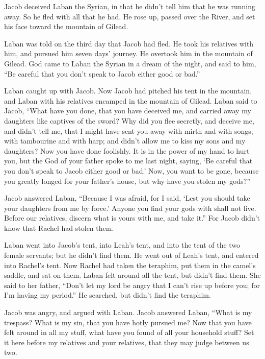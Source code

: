\myverse{}Jacob deceived Laban the Syrian, in that he didn’t tell him that he was running away.   \myverse{}So he fled with all that he had. He rose up, passed over the River, and set his face toward the mountain of Gilead.

\myverse{}Laban was told on the third day that Jacob had fled.  \myverse{}He took his relatives with him, and pursued him seven days’ journey. He overtook him in the mountain of Gilead.  \myverse{}God came to Laban the Syrian in a dream of the night, and said to him, “Be careful that you don’t speak to Jacob either good or bad.”

\myverse{}Laban caught up with Jacob. Now Jacob had pitched his tent in the mountain, and Laban with his relatives encamped in the mountain of Gilead.  \myverse{}Laban said to Jacob, “What have you done, that you have deceived me, and carried away my daughters like captives of the sword?  \myverse{}Why did you flee secretly, and deceive me, and didn’t tell me, that I might have sent you away with mirth and with songs, with tambourine and with harp;  \myverse{}and didn’t allow me to kiss my sons and my daughters? Now you have done foolishly.  \myverse{}It is in the power of my hand to hurt you, but the God of your father spoke to me last night, saying, ‘Be careful that you don’t speak to Jacob either good or bad.’  \myverse{}Now, you want to be gone, because you greatly longed for your father’s house, but why have you stolen my gods?”

\myverse{}Jacob answered Laban, “Because I was afraid, for I said, ‘Lest you should take your daughters from me by force.’  \myverse{}Anyone you find your gods with shall not live. Before our relatives, discern what is yours with me, and take it.” For Jacob didn’t know that Rachel had stolen them.

\myverse{}Laban went into Jacob’s tent, into Leah’s tent, and into the tent of the two female servants; but he didn’t find them. He went out of Leah’s tent, and entered into Rachel’s tent.  \myverse{}Now Rachel had taken the teraphim, put them in the camel’s saddle, and sat on them. Laban felt around all the tent, but didn’t find them.  \myverse{}She said to her father, “Don’t let my lord be angry that I can’t rise up before you; for I’m having my period.” He searched, but didn’t find the teraphim.

\myverse{}Jacob was angry, and argued with Laban. Jacob answered Laban, “What is my trespass? What is my sin, that you have hotly pursued me?  \myverse{}Now that you have felt around in all my stuff, what have you found of all your household stuff? Set it here before my relatives and your relatives, that they may judge between us two.

